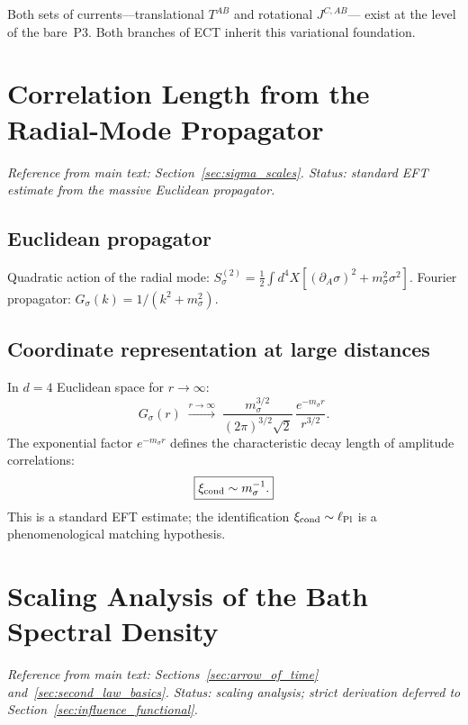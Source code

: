 \documentclass[11pt,a4paper]{article}
\numberwithin{equation}{section}
\begin{document}
Both sets of currents---translational $T^{AB}$ and rotational $J^{C,AB}$---
exist at the level of the bare~P3. Both branches of ECT inherit this
variational foundation.

\section{Correlation Length from the Radial-Mode Propagator}
\label{app:corr_length}

\textit{Reference from main text: Section~\ref{sec:sigma_scales}.
Status: standard EFT estimate from the massive Euclidean propagator.}

\subsection*{Euclidean propagator}

Quadratic action of the radial mode:
$S_\sigma^{(2)}=\frac{1}{2}\int d^4X[(\partial_A\sigma)^2+m_\sigma^2\sigma^2]$.
Fourier propagator: $G_\sigma(k)=1/(k^2+m_\sigma^2)$.

\subsection*{Coordinate representation at large distances}

In $d=4$ Euclidean space for $r\to\infty$:
\begin{equation}
  \label{eq:G_coord}
  G_\sigma(r)\;\xrightarrow{r\to\infty}\;
  \frac{m_\sigma^{3/2}}{(2\pi)^{3/2}\sqrt{2}}\,
  \frac{e^{-m_\sigma r}}{r^{3/2}}.
\end{equation}
The exponential factor $e^{-m_\sigma r}$ defines the characteristic
decay length of amplitude correlations:
\begin{equation}
  \boxed{\xi_{\rm cond}\sim m_\sigma^{-1}.}
\end{equation}
This is a standard EFT estimate; the identification
$\xi_{\rm cond}\sim\ell_{\rm Pl}$ is a phenomenological matching hypothesis.

\section{Scaling Analysis of the Bath Spectral Density}
\label{app:ohmic_markov}

\textit{Reference from main text: Sections~\ref{sec:arrow_of_time}
and~\ref{sec:second_law_basics}.
Status: scaling analysis; strict derivation deferred to Section~\ref{sec:influence_functional}.}
\end{document}
